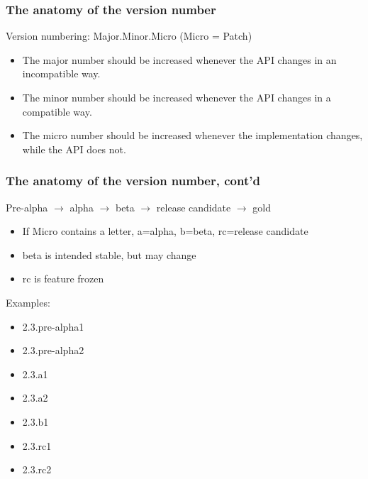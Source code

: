 \documentclass{beamer}
\newcommand{\megaskip}{\bigskip\bigskip\bigskip\bigskip}
\begin{document}
\begin{frame}
  \frametitle{The anatomy of the version number}

  Version numbering:  Major.Minor.Micro (Micro = Patch)

  \megaskip

  \begin{itemize}
  \item The major number should be increased whenever the API changes in an
    incompatible way.\pause
  \item The minor number should be increased whenever the API changes in a
    compatible way.\pause
  \item The micro number should be increased whenever the implementation
    changes, while the API does not.
  \end{itemize}

\end{frame}
\begin{frame}
  \frametitle{The anatomy of the version number, cont'd}

  Pre-alpha $\to$ alpha $\to$ beta $\to$ release candidate $\to$ gold

  \pause

  \begin{itemize}
  \item If Micro contains a letter, a=alpha, b=beta, rc=release candidate
  \item beta is intended stable, but may change
  \item rc is feature frozen
  \end{itemize}

  \pause

  Examples:
  \begin{itemize}
  \item 2.3.pre-alpha1
  \item 2.3.pre-alpha2
  \item 2.3.a1
  \item 2.3.a2
  \item 2.3.b1
  \item 2.3.rc1
  \item 2.3.rc2
  \end{itemize}
\end{frame}
\end{document}
